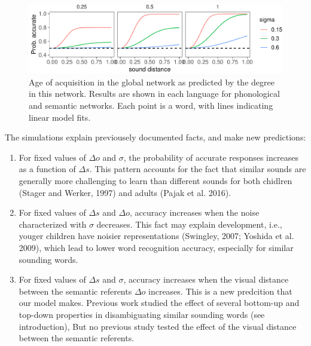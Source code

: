\documentclass[10pt, letterpaper]{article}
\newenvironment{CodeChunk}{}{}
\begin{document}
\begin{CodeChunk}
\begin{figure}[h]

{\centering \includegraphics{figs/simulation-1} 

}

\caption{\label{fig:data_all}Age of acquisition in the global network as predicted by the degree in this network. Results are shown in each language for phonological and semantic networks. Each point is a word, with lines indicating linear model fits.}\label{fig:simulation}
\end{figure}
\end{CodeChunk}

The simulations explain previousely documented facts, and make new
predictions:

\begin{enumerate}
\def\labelenumi{\arabic{enumi})}
\item
  For fixed values of \(\Delta o\) and \(\sigma\), the probability of
  accurate responses increases as a function of \(\Delta s\). This
  pattern accounts for the fact that similar sounds are generally more
  challenging to learn than different sounds for both chidlren (Stager
  and Werker, 1997) and adults (Pajak et al. 2016).
\item
  For fixed values of \(\Delta s\) and \(\Delta o\), accuracy increases
  when the noise characterized with \(\sigma\) decreases. This fact may
  explain development, i.e., youger children have noisier
  representations (Swingley, 2007; Yoshida et al. 2009), which lead to
  lower word recognition accuracy, especially for similar sounding
  words.
\item
  For fixed values of \(\Delta s\) and \(\sigma\), accuracy increases
  when the visual distance between the semantic referents \(\Delta o\)
  increases. This is a new predcition that our model makes. Previous
  work studied the effect of several bottom-up and top-down properties
  in disambiguating similar sounding words (see introduction), But no
  previous study tested the effect of the visual distance between the
  semantic referents.
\end{enumerate}
\end{document}
